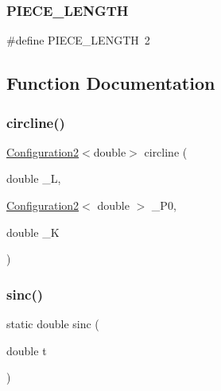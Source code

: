 \mbox{\label{dubins_8hh_a5b2500ca93a5100f73dc442d3cfea7d4}} 
\subsubsection{\texorpdfstring{PIECE\_LENGTH}{PIECE\_LENGTH}}
{\footnotesize\ttfamily \#define P\+I\+E\+C\+E\+\_\+\+L\+E\+N\+G\+TH~2}



\subsection{Function Documentation}
\mbox{\label{dubins_8hh_adef8b363044d7fed558e5b47d8d6a3a0}} 
\subsubsection{\texorpdfstring{circline()}{circline()}}
{\footnotesize\ttfamily \mbox{\hyperlink{class_configuration2}{Configuration2}}$<$double$>$ circline (\begin{DoxyParamCaption}\item[{double}]{\+\_\+L,  }\item[{\mbox{\hyperlink{class_configuration2}{Configuration2}}$<$ double $>$}]{\+\_\+\+P0,  }\item[{double}]{\+\_\+K }\end{DoxyParamCaption})}

\mbox{\label{dubins_8hh_a5c88710b236a514392351a4d13d2e767}} 
\subsubsection{\texorpdfstring{sinc()}{sinc()}}
{\footnotesize\ttfamily static double sinc (\begin{DoxyParamCaption}\item[{double}]{t }\end{DoxyParamCaption})\hspace{0.3cm}{\ttfamily [static]}}

